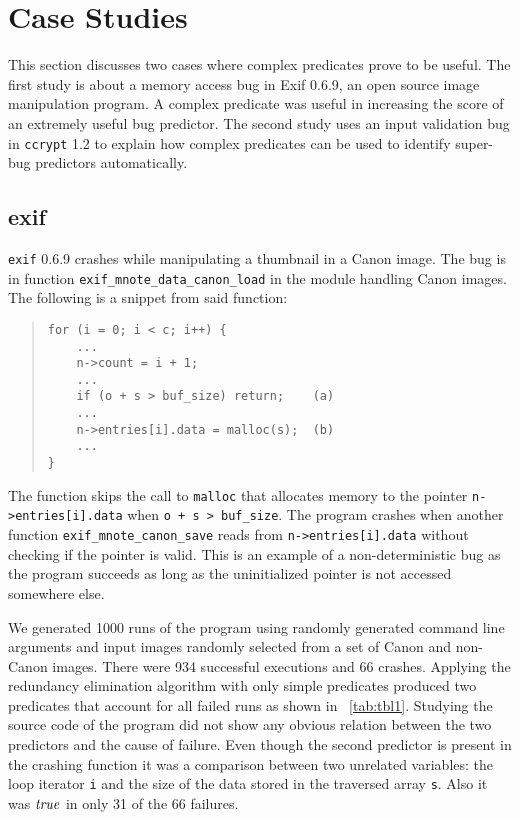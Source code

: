 
\section{Case Studies}
\label{sec-qual}
This section discusses two cases where complex predicates prove to be useful.  The first study is about a memory access bug in Exif 0.6.9, an open source image manipulation program.  A complex predicate was useful in increasing the score of an extremely useful bug predictor.  The second study uses an input validation bug in \texttt{ccrypt} 1.2 to explain how complex predicates can be used to identify super-bug predictors automatically.

\subsection{exif}
\texttt{exif} 0.6.9 crashes while manipulating a thumbnail in a Canon image.  The bug is in function \texttt{exif\_mnote\_data\_canon\_load} in the module handling Canon images.  The following is a snippet from said function:
\begin{quote}
\begin{verbatim}
for (i = 0; i < c; i++) {
    ...
    n->count = i + 1;
    ...
    if (o + s > buf_size) return;    (a)
    ...
    n->entries[i].data = malloc(s);  (b)
    ...
}
\end{verbatim}
\end{quote}

The function skips the call to \texttt{malloc} that allocates memory to the pointer \texttt{n->entries[i].data} when \texttt{o + s > buf\_size}.  The program crashes when another function \texttt{exif\_mnote\_canon\_save} reads from \texttt{n->entries[i].data} without checking if the pointer is valid.  This is an example of a non-deterministic bug as the program succeeds as long as the uninitialized pointer is not accessed somewhere else.

We generated 1000 runs of the program using randomly generated command line arguments and input images randomly selected from a set of Canon and non-Canon images.  There were 934 successful executions and 66 crashes.  Applying the redundancy elimination algorithm with only simple predicates produced two predicates that account for all failed runs as shown in ~\autoref{tab:tbl1}.  Studying the source code of the program did not show any obvious relation between the two predictors and the cause of failure.  Even though the second predictor is present in the crashing function it was a comparison between two unrelated variables: the loop iterator \texttt{i} and the size of the data stored in the traversed array \texttt{s}.  Also it was $\mathit{true}$ in only 31 of the 66 failures.

